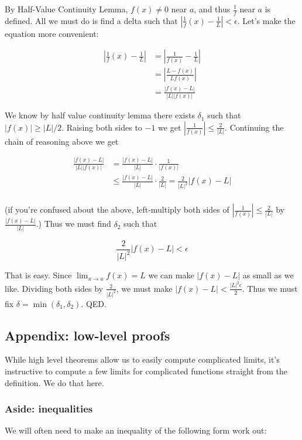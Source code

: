 By Half-Value Continuity Lemma, $f(x)\neq 0$ near $a$, and thus
$\frac{1}{f}$ near $a$ is defined. All we must do is find a delta such
that $\left|\frac{1}{f}(x)-\frac{1}{L}\right|<\epsilon$. Let's make the
equation more convenient:

\begin{align*}
    \left|\frac{1}{f}(x)-\frac{1}{L}\right|&=\left|\frac{1}{f(x)}-\frac{1}{L}\right|\\
    &=\left|\frac{L-f(x)}{Lf(x)}\right|\\
    &=\frac{|f(x)-L|}{|L||f(x)|}
\end{align*}

We know by half value continuity lemma there exists $\delta_1$ such that
$|f(x)|\geq |L|/2$. Raising both sides to $-1$ we get
$|\frac{1}{f(x)}|\leq \frac{2}{|L|}$. Continuing the chain of reasoning
above we get

\begin{align*}
    \frac{|f(x)-L|}{|L||f(x)|}&=\frac{|f(x)-L|}{|L|}\cdot\frac{1}{|f(x)|}\\
    &\leq\frac{|f(x)-L|}{|L|}\cdot\frac{2}{|L|}=\frac{2}{|L|^2}|f(x)-L|\\
\end{align*}

(if you're confused about the above, left-multiply both sides of
$|\frac{1}{f(x)}|\leq \frac{2}{|L|}$ by $\frac{|f(x)-L|}{|L|}$.) Thus we
must find $\delta_2$ such that

\[\frac{2}{|L|^2}|f(x)-L|<\epsilon\]

That is easy. Since $\lim_{x\to a}f(x)=L$ we can make $|f(x)-L|$ as
small as we like. Dividing both sides by $\frac{2}{|L|^2}$, we must
make $|f(x)-L|<\frac{|L|^2\epsilon}{2}$. Thus we must fix
$\delta=\min(\delta_1, \delta_2)$. QED.

\subsection{Appendix: low-level proofs}

While high level theorems allow us to easily compute complicated
limits, it's instructive to compute a few limits for complicated
functions straight from the definition. We do that here.

\subsubsection{Aside: inequalities}

We will often need to make an inequality of the following form work out:

